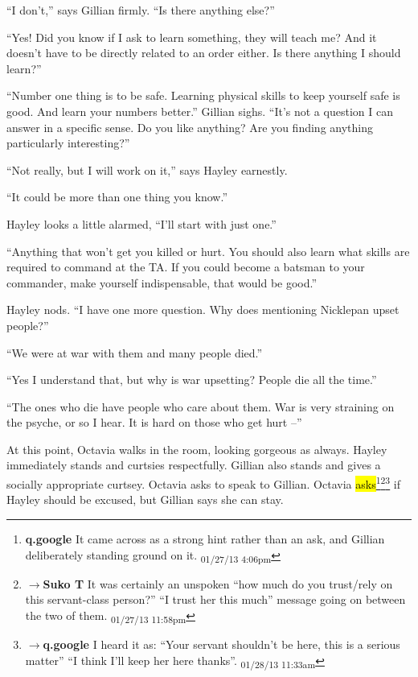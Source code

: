 ``I don't,'' says Gillian firmly.  ``Is there anything else?''

``Yes!  Did you know if I ask to learn something, they will teach me?  And it doesn't have to be directly related to an order either.  Is there anything I should learn?''

``Number one thing is to be safe.  Learning physical skills to keep yourself safe is good.  And learn your numbers better.''  Gillian sighs.  ``It's not a question I can answer in a specific sense.  Do you like anything?  Are you finding anything particularly interesting?''

``Not really, but I will work on it,'' says Hayley earnestly. 

``It could be more than one thing you know.''

Hayley looks a little alarmed, ``I'll start with just one.''

``Anything that won't get you killed or hurt.  You should also learn what skills are required to command at the TA.  If you could become a batsman to your commander, make yourself indispensable, that would be good.''

Hayley nods.  ``I have one more question.  Why does mentioning Nicklepan upset people?''

``We were at war with them and many people died.''

``Yes I understand that, but why is war upsetting?  People die all the time.''

``The ones who die have people who care about them.  War is very straining on the psyche, or so I hear.  It is hard on those who get hurt --''



At this point, Octavia walks in the room, looking gorgeous as always.  Hayley immediately stands and curtsies respectfully.  Gillian also stands and gives a socially appropriate curtsey.  Octavia asks to speak to Gillian.  Octavia \hl{asks}\footnote{\textbf{q.google }It came across as a strong hint rather than an ask, and Gillian deliberately standing ground on it. \textsubscript{01/27/13 4:06pm}}\footnote{$\rightarrow$\textbf{Suko T }It was certainly an unspoken ``how much do you trust/rely on this servant-class person?'' ``I trust her this much'' message going on between the two of them. \textsubscript{01/27/13 11:58pm}}\footnote{$\rightarrow$\textbf{q.google }I heard it as: ``Your servant shouldn't be here, this is a serious matter'' ``I think I'll keep her here thanks''. \textsubscript{01/28/13 11:33am}} if Hayley should be excused, but Gillian says she can stay.  



